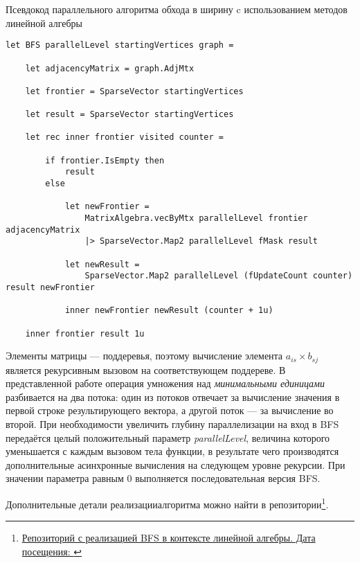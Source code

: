 \begin{algorithm}[h]
\caption{Псевдокод параллельного алгоритма обхода в ширину c использованием методов линейной алгебры}
\label{alg:bfs_example}
\begin{lstlisting}[language=pseudoFSharp]
let BFS parallelLevel startingVertices graph =

	let adjacencyMatrix = graph.AdjMtx

    let frontier = SparseVector startingVertices

    let result = SparseVector startingVertices

    let rec inner frontier visited counter =

        if frontier.IsEmpty then
            result
        else

            let newFrontier =
                MatrixAlgebra.vecByMtx parallelLevel frontier adjacencyMatrix
                |> SparseVector.Map2 parallelLevel fMask result

            let newResult =
                SparseVector.Map2 parallelLevel (fUpdateCount counter) result newFrontier

            inner newFrontier newResult (counter + 1u)

    inner frontier result 1u
\end{lstlisting}
\end{algorithm}


Элементы матрицы --- поддеревья, поэтому вычисление элемента $a_{is} \times b_{sj}$ является рекурсивным вызовом на соответствующем поддереве. В представленной работе операция умножения над \textit{минимальными единицами} разбивается на два потока: один из потоков отвечает за вычисление значения в первой строке результирующего вектора, а другой поток --- за вычисление во второй. При необходимости увеличить глубину параллелизации на вход в BFS передаётся целый положительный параметр \textit{parallelLevel}, величина которого уменьшается с каждым вызовом тела функции, в результате чего производятся дополнительные асинхронные вычисления на следующем уровне рекурсии. При значении параметра равным 0 выполняется последовательная версия BFS.


\noindent Дополнительные детали реализацииалгоритма можно найти в репозитории\footnote{\href{https://github.com/artem-burashnikov}{Репозиторий с реализацией BFS в контексте линейной алгебры. Дата посещения: }}.